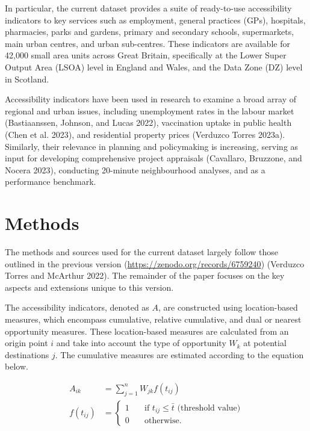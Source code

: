 \documentclass{article}
\begin{document}
In particular, the current dataset provides a suite of ready-to-use
accessibility indicators to key services such as employment, general
practices (GPs), hospitals, pharmacies, parks and gardens, primary and
secondary schools, supermarkets, main urban centres, and urban
sub-centres. These indicators are available for 42,000 small area units
across Great Britain, specifically at the Lower Super Output Area (LSOA)
level in England and Wales, and the Data Zone (DZ) level in Scotland.

Accessibility indicators have been used in research to examine a broad
array of regional and urban issues, including unemployment rates in the
labour market (Bastiaanssen, Johnson, and Lucas 2022), vaccination
uptake in public health (Chen et al. 2023), and residential property
prices (Verduzco Torres 2023a). Similarly, their relevance in planning
and policymaking is increasing, serving as input for developing
comprehensive project appraisals (Cavallaro, Bruzzone, and Nocera 2023),
conducting 20-minute neighbourhood analyses, and as a performance
benchmark.

\hypertarget{methods}{%
\section{Methods}\label{methods}}

The methods and sources used for the current dataset largely follow
those outlined in the previous version
(\url{https://zenodo.org/records/6759240}) (Verduzco Torres and McArthur
2022). The remainder of the paper focuses on the key aspects and
extensions unique to this version.

The accessibility indicators, denoted as \(A\), are constructed using
location-based measures, which encompass cumulative, relative
cumulative, and dual or nearest opportunity measures. These
location-based measures are calculated from an origin point \(i\) and
take into account the type of opportunity \(W_k\) at potential
destinations \(j\). The cumulative measures are estimated according to
the equation below.

\[
\begin{aligned}
A_{ik} &= \sum_{j=1}^{n} W_{jk} f(t_{ij}) \\
f(t_{ij}) &= \left\{
      \begin{array}{ll}
          1 & \quad \text{if }t_{ij} \leq \bar{t} \text{ (threshold value)} \\
          0 & \quad \text{otherwise}.
      \end{array}
    \right.
\end{aligned}
\]
\end{document}

